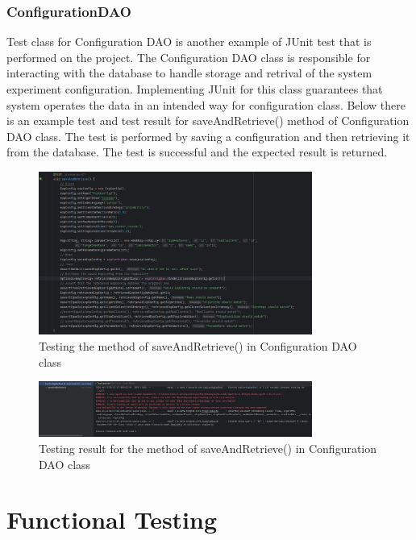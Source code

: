 \newpage
\subsubsection{ConfigurationDAO}

Test class for Configuration DAO is another example of JUnit test that is performed on the project. The Configuration DAO class is responsible for interacting with the database to handle storage and retrival of the system experiment configuration.
Implementing JUnit for this class guarantees that system operates the data in an intended way for configuration class. Below there is an example test and test result for saveAndRetrieve() method of Configuration DAO class. The test is performed by
saving a configuration and then retrieving it from the database. The test is successful and the expected result is returned.

\begin{figure}[ht!]
    \centering
    \includegraphics[width=0.8\textwidth]{images/5_testing/expconfigdao-test}
    \caption{Testing the method of saveAndRetrieve() in Configuration DAO class}
    \label{fig:c_dao_test}
\end{figure}

\begin{figure}[ht!]
    \centering
    \includegraphics[width=0.8\textwidth]{images/5_testing/expconfigdao-test-result}
    \caption{Testing result for the method of saveAndRetrieve() in Configuration DAO class}
    \label{fig:c_dao_test_result}
\end{figure}


\newpage
\section{Functional Testing}

